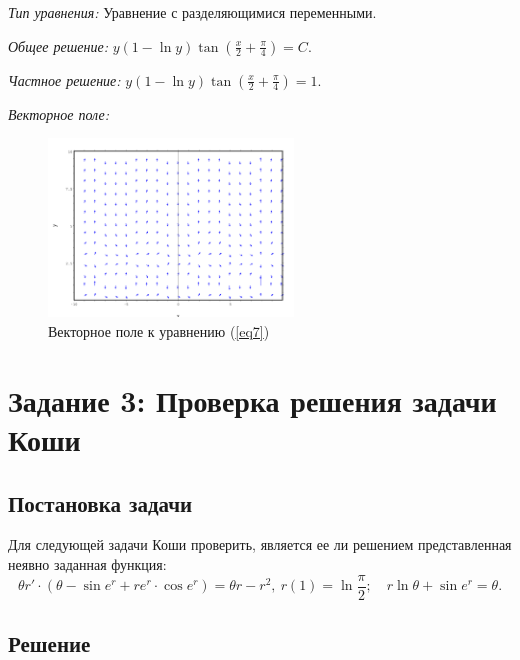 \documentclass[14pt, a4paper, titlepage, fleqn]{extarticle}
\begin{document}
\begin{enumerate}
                \textit{Тип уравнения:}
                Уравнение с разделяющимися переменными.

                \textit{Общее решение:}
                \(
                    \displaystyle
                    y(1 - \ln{y}) \tan\left( \frac{x}{2} + \frac{\pi}{4} \right) = C.
                \)

                \textit{Частное решение:}
                \(
                    \displaystyle
                    y(1 - \ln{y}) \tan\left( \frac{x}{2} + \frac{\pi}{4} \right) = 1.
                \)

                \textit{Векторное поле:}

                \begin{figure}[H]
                    \centering
                    \includegraphics[width=6.5cm]{pictures/vector_field_7.pdf}
                    \caption{Векторное поле к уравнению (\ref{eq7})}
                \end{figure}
            \end{enumerate}

    \pagebreak

    \section{Задание 3: Проверка решения задачи Коши}

        \subsection{Постановка задачи}
            Для следующей задачи Коши проверить, является ее ли
            решением представленная неявно заданная функция:
            \[
                \theta r' \cdot \left( \theta - \sin{e^r} + r e^r \cdot \cos{e^r} \right)
                = \theta r - r^2, ~ r(1) = \ln{\frac{\pi}{2}}; \quad r \ln{\theta} + \sin{e^r} = \theta.
            \]

        \subsection{Решение}
            
\end{document}
